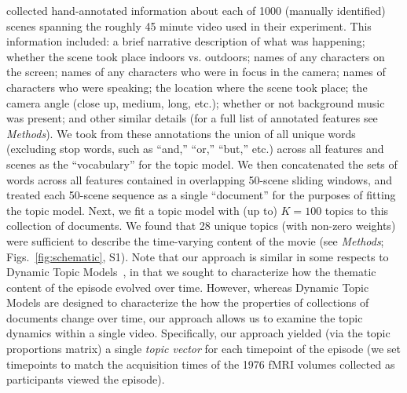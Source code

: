 \documentclass{article}
\newcommand{\topics}{S1}
\begin{document}
\cite{ChenEtal17} collected hand-annotated information about each of 1000 (manually identified) scenes spanning the roughly 45 minute video used in their experiment.  This information included: a brief narrative description of what was happening; whether the scene took place indoors vs. outdoors; names of any characters on the screen; names of any characters who were in focus in the camera; names of characters who were speaking; the location where the scene took place; the camera angle (close up, medium, long, etc.); whether or not background music was present; and other similar details (for a full list of annotated features see \textit{Methods}).  We took from these annotations the union of all unique words (excluding stop words, such as ``and,'' ``or,'' ``but,'' etc.) across all features and scenes as the ``vocabulary'' for the topic model.  We then concatenated the sets of words across all features contained in overlapping 50-scene sliding windows, and treated each 50-scene sequence as a single ``document'' for the purposes of fitting the topic model.  Next, we fit a topic model with (up to) $K = 100$ topics to this collection of documents.  We found that 28 unique topics (with non-zero weights) were sufficient to describe the time-varying content of the movie (see \textit{Methods}; Figs.~\ref{fig:schematic}, \topics).  Note that our approach is similar in some respects to Dynamic Topic Models~\citep{BleiLaff06}, in that we sought to characterize how the thematic content of the episode evolved over time.  However, whereas Dynamic Topic Models are designed to characterize the how the properties of collections of documents change over time, our approach allows us to examine the topic dynamics within a single video.  Specifically, our approach yielded (via the topic proportions matrix) a single \textit{topic vector} for each timepoint of the episode (we set timepoints to match the acquisition times of the 1976 fMRI volumes collected as participants viewed the episode).
\end{document}
